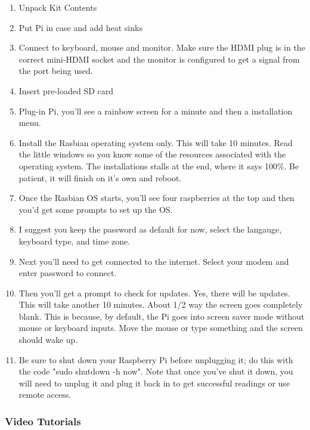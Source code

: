 \documentclass{article}\usepackage[]{graphicx}\usepackage[]{color}
\begin{document}
\begin{enumerate}

\item Unpack Kit Contents
\item Put Pi in case and add heat sinks
\item Connect to keyboard, mouse and monitor. Make sure the HDMI plug is in the correct mini-HDMI socket and the monitor is configured to get a signal from the port being used. 
\item Insert pre-loaded SD card
\item Plug-in Pi, you'll see a rainbow screen for a minute and then a installation menu. 
\item Install the Rasbian operating system only. This will take 10 minutes. Read the little windows so you know some of the resources associated with the operating system. The installations stalls at the end, where it says 100\%. Be patient, it will finish on it's own and reboot. 
\item Once the Rasbian OS starts, you'll see four raspberries at the top and then you'd get some prompts to set up the OS. 
\item I suggest you keep the password as default for now, select the langauge, keyboard type, and time zone. 
\item Next you'll need to get connected to the internet. Select your modem and enter password to connect.
\item Then you'll get a prompt to check for updates. Yes, there will be updates. This will take another 10 minutes. About 1/2 way the screen goes completely blank. This is because, by default, the Pi goes into screen saver mode without mouse or keyboard inputs. Move the mouse or type something and the screen should wake up.  
\item Be sure to shut down your Raspberry Pi before unplugging it; do this with the code "sudo shutdown -h now".  Note that once you've shut it down, you will need to unplug it and plug it back in to get successful readings or use remote access.

\end{enumerate}



\subsubsection{Video Tutorials}

\end{document}
